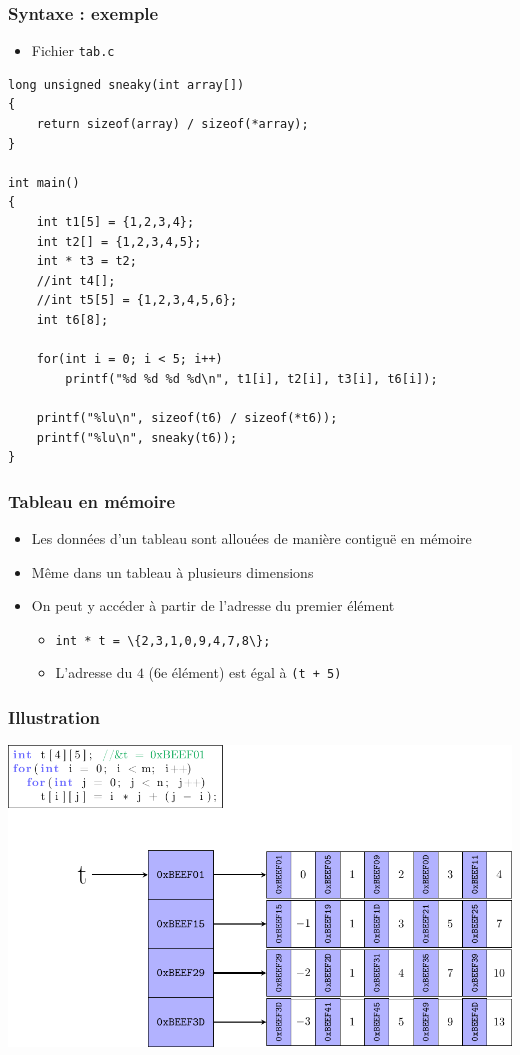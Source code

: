 \begin{frame}[containsverbatim]
\frametitle{Syntaxe : exemple}
\begin{itemize}
\item Fichier \texttt{tab.c}
\end{itemize}
\begin{lstlisting}
long unsigned sneaky(int array[])
{
	return sizeof(array) / sizeof(*array);
}

int main()
{
	int t1[5] = {1,2,3,4};
	int t2[] = {1,2,3,4,5};
	int * t3 = t2;
	//int t4[]; 
	//int t5[5] = {1,2,3,4,5,6}; 
	int t6[8];
	
	for(int i = 0; i < 5; i++)
		printf("%d %d %d %d\n", t1[i], t2[i], t3[i], t6[i]);
		
	printf("%lu\n", sizeof(t6) / sizeof(*t6));
	printf("%lu\n", sneaky(t6));
}
\end{lstlisting}
\end{frame}

\begin{frame}
\frametitle{Tableau en mémoire}
\begin{itemize}[<+->]
\item Les données d'un tableau sont allouées de manière contiguë en mémoire
\item Même dans un tableau à plusieurs dimensions
\item On peut y accéder à partir de l'adresse du premier élément
	\begin{itemize}
	\item \lstinline|int * t = \{2,3,1,0,9,4,7,8\};|
	\item L'adresse du $4$ (6e élément) est égal à \lstinline|(t + 5)|
	\end{itemize}
\end{itemize}
\end{frame}

\begin{frame}
\frametitle{Illustration}
\begin{center}
\includegraphics[width=.9\textwidth]{pics/tab.pdf}
\end{center}
\end{frame}

